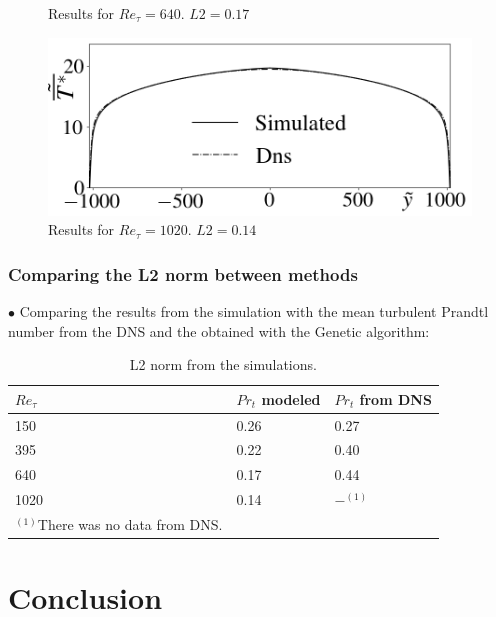 \documentclass[xcolor=dvipsnames,8pt,aspectratio=34]{beamer}
\begin{document}
\begin{frame}
\begin{minipage}[h!]{0.5\textwidth}
\begin{figure}
		\caption{Results for $Re_\tau = 640$. $L2 = 0.17$}
	\end{figure}
	\begin{figure}
		\centering
		\includegraphics[angle=0, scale=0.24]{fotos_formatacao_final/Temperature_1000_071_Prt(Ret)_A26}
		\caption{Results for $Re_\tau = 1020$. $L2 = 0.14$}
	\end{figure}
\end{minipage}		
\end{frame}	


	
	
	
			\begin{frame}
	\frametitle{Comparing the L2 norm between methods}
	$\bullet$ Comparing the results from the simulation with the mean turbulent Prandtl number from the DNS and the obtained with the Genetic algorithm:\\
		\begin{table}[!h]
			\centering
			\caption{L2 norm from the simulations.}
		\begin{tabular}{lll}
		\hline
		$Re_\tau$ & $Pr_t$ modeled & $Pr_t$ from DNS\\
		\hline
		150  &  0.26 & 0.27 \\
		395  &  0.22 & 0.40 \\
		640  &  0.17 & 0.44 \\
		1020 &  0.14 & $ - ^{(1)} $ \\ 
		\hline
		$^{(1)}$There was no data from DNS.
		\end{tabular}
		\end{table}
	\end{frame}	
	
	
	
	
	\section{Conclusion}
	
\end{document}
